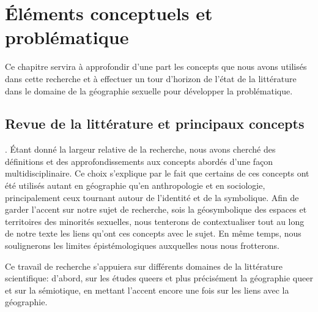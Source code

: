 \chapter{Éléments conceptuels et problématique}
\label{cha:elements_conceptuels_et_problematique}


Ce chapitre servira à approfondir d'une part les concepts que nous avons utilisés dans cette recherche et à effectuer un tour d'horizon de l'état de la littérature dans le domaine de la géographie sexuelle pour développer la problématique.

\section{Revue de la littérature et principaux concepts}
\label{sec:revue_de_la_litterature_et_principaux_concepts}

.
Étant donné la largeur relative de la recherche, nous avons cherché des définitions et des approfondissements aux concepts abordés d'une façon multidisciplinaire.
Ce choix s'explique par le fait que certains de ces concepts ont été utilisés autant en géographie qu'en anthropologie et en sociologie, principalement ceux tournant autour de l'identité et de la symbolique.
Afin de garder l’accent sur notre sujet de recherche, sois la géosymbolique des espaces et territoires des minorités sexuelles, nous tenterons de contextualiser tout au long de notre texte les liens qu'ont ces concepts avec le sujet.
En même temps, nous soulignerons les limites épistémologiques auxquelles nous nous frotterons.

Ce travail de recherche s’appuiera sur différents domaines de la littérature scientifique: d'abord, sur les études queers et plus précisément la géographie queer et sur la sémiotique, en mettant l'accent encore une fois sur les liens avec la géographie.


